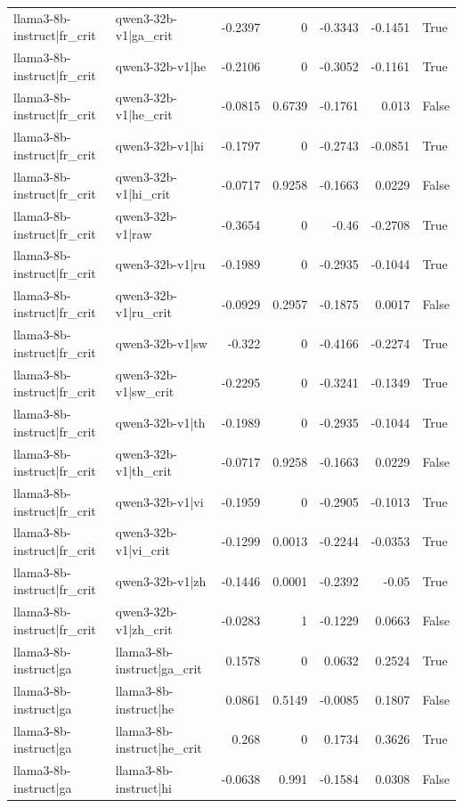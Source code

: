 \begin{table}
\begin{tabular}{l l r r r r l}
llama3-8b-instruct|fr_crit & qwen3-32b-v1|ga_crit & -0.2397 & 0 & -0.3343 & -0.1451 & True \\
llama3-8b-instruct|fr_crit & qwen3-32b-v1|he & -0.2106 & 0 & -0.3052 & -0.1161 & True \\
llama3-8b-instruct|fr_crit & qwen3-32b-v1|he_crit & -0.0815 & 0.6739 & -0.1761 & 0.013 & False \\
llama3-8b-instruct|fr_crit & qwen3-32b-v1|hi & -0.1797 & 0 & -0.2743 & -0.0851 & True \\
llama3-8b-instruct|fr_crit & qwen3-32b-v1|hi_crit & -0.0717 & 0.9258 & -0.1663 & 0.0229 & False \\
llama3-8b-instruct|fr_crit & qwen3-32b-v1|raw & -0.3654 & 0 & -0.46 & -0.2708 & True \\
llama3-8b-instruct|fr_crit & qwen3-32b-v1|ru & -0.1989 & 0 & -0.2935 & -0.1044 & True \\
llama3-8b-instruct|fr_crit & qwen3-32b-v1|ru_crit & -0.0929 & 0.2957 & -0.1875 & 0.0017 & False \\
llama3-8b-instruct|fr_crit & qwen3-32b-v1|sw & -0.322 & 0 & -0.4166 & -0.2274 & True \\
llama3-8b-instruct|fr_crit & qwen3-32b-v1|sw_crit & -0.2295 & 0 & -0.3241 & -0.1349 & True \\
llama3-8b-instruct|fr_crit & qwen3-32b-v1|th & -0.1989 & 0 & -0.2935 & -0.1044 & True \\
llama3-8b-instruct|fr_crit & qwen3-32b-v1|th_crit & -0.0717 & 0.9258 & -0.1663 & 0.0229 & False \\
llama3-8b-instruct|fr_crit & qwen3-32b-v1|vi & -0.1959 & 0 & -0.2905 & -0.1013 & True \\
llama3-8b-instruct|fr_crit & qwen3-32b-v1|vi_crit & -0.1299 & 0.0013 & -0.2244 & -0.0353 & True \\
llama3-8b-instruct|fr_crit & qwen3-32b-v1|zh & -0.1446 & 0.0001 & -0.2392 & -0.05 & True \\
llama3-8b-instruct|fr_crit & qwen3-32b-v1|zh_crit & -0.0283 & 1 & -0.1229 & 0.0663 & False \\
llama3-8b-instruct|ga & llama3-8b-instruct|ga_crit & 0.1578 & 0 & 0.0632 & 0.2524 & True \\
llama3-8b-instruct|ga & llama3-8b-instruct|he & 0.0861 & 0.5149 & -0.0085 & 0.1807 & False \\
llama3-8b-instruct|ga & llama3-8b-instruct|he_crit & 0.268 & 0 & 0.1734 & 0.3626 & True \\
llama3-8b-instruct|ga & llama3-8b-instruct|hi & -0.0638 & 0.991 & -0.1584 & 0.0308 & False \\

\end{tabular}
\end{table}
